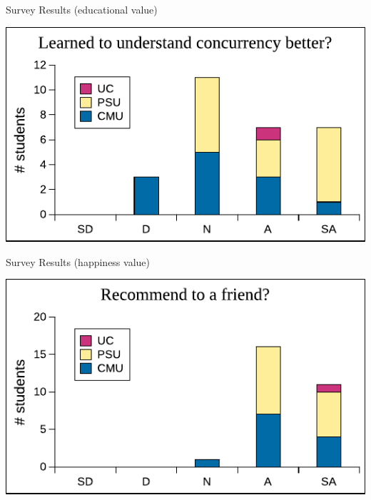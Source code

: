 \documentclass[xcolor=dvipsnames]{beamer}
\begin{document}
\begin{frame}{Survey Results (educational value)}
	\begin{center}
		\includegraphics[width=\textwidth]{../survey8.pdf} %
	\end{center}
\end{frame}

\begin{frame}{Survey Results (happiness value)}
	\begin{center}
		\includegraphics[width=\textwidth]{../survey10.pdf} %
	\end{center}
\end{frame}
\end{document}
